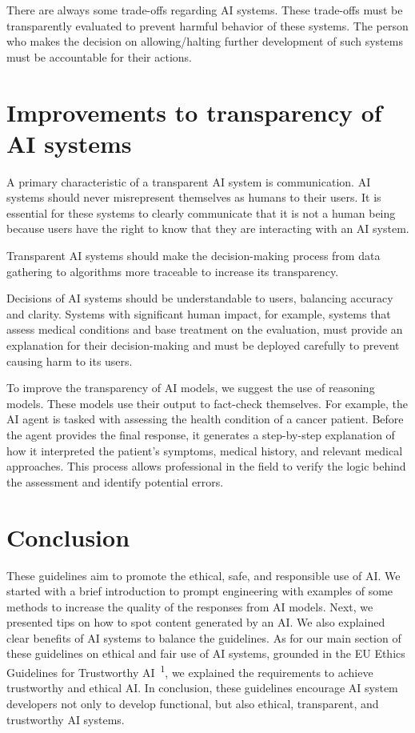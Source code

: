 There are always some trade-offs regarding AI systems. These trade-offs must be transparently evaluated to prevent harmful behavior of these systems. The person who makes the decision on allowing/halting further development of such systems must be accountable for their actions.

\section{Improvements to transparency of AI systems}
A primary characteristic of a transparent AI system is communication. AI systems should never misrepresent themselves as humans to their users. It is essential for these systems to clearly communicate that it is not a human being because users have the right to know that they are interacting with an AI system.

Transparent AI systems should make the decision-making process from data gathering to algorithms more traceable to increase its transparency.

Decisions of AI systems should be understandable to users, balancing accuracy and clarity. Systems with significant human impact, for example, systems that assess medical conditions and base treatment on the evaluation, must provide an explanation for their decision-making and must be deployed carefully to prevent causing harm to its users.

To improve the transparency of AI models, we suggest the use of reasoning models. These models use their output to fact-check themselves. For example, the AI agent is tasked with assessing the health condition of a cancer patient. Before the agent provides the final response, it generates a step-by-step explanation of how it interpreted the patient’s symptoms, medical history, and relevant medical approaches. This process allows professional in the field to verify the logic behind the assessment and identify potential errors.

\section{Conclusion}
These guidelines aim to promote the ethical, safe, and responsible use of AI. We started with a brief introduction to prompt engineering with examples of some methods to increase the quality of the responses from AI models. Next, we presented tips on how to spot content generated by an AI. We also explained clear benefits of AI systems to balance the guidelines. As for our main section of these guidelines on ethical and fair use of AI systems, grounded in the EU Ethics Guidelines for Trustworthy AI~\textsuperscript{1}, we explained the requirements to achieve trustworthy and ethical AI. 
In conclusion, these guidelines encourage AI system developers not only to develop functional, but also ethical, transparent, and trustworthy AI systems.


